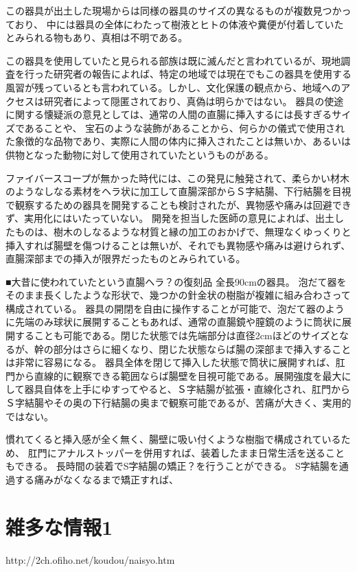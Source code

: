 この器具が出土した現場からは同様の器具のサイズの異なるものが複数見つかっており、
中には器具の全体にわたって樹液とヒトの体液や糞便が付着していたとみられる物もあり、真相は不明である。

この器具を使用していたと見られる部族は既に滅んだと言われているが、現地調査を行った研究者の報告によれば、特定の地域では現在でもこの器具を使用する風習が残っているとも言われている。しかし、文化保護の観点から、地域へのアクセスは研究者によって隠匿されており、真偽は明らかではない。
器具の使途に関する懐疑派の意見としては、通常の人間の直腸に挿入するには長すぎるサイズであることや、
宝石のような装飾があることから、何らかの儀式で使用された象徴的な品物であり、実際に人間の体内に挿入されたことは無いか、あるいは供物となった動物に対して使用されていたというものがある。

ファイバースコープが無かった時代には、この発見に触発されて、柔らかい材木のようなしなる素材をヘラ状に加工して直腸深部からＳ字結腸、下行結腸を目視で観察するための器具を開発することも検討されたが、異物感や痛みは回避できず、実用化にはいたっていない。
開発を担当した医師の意見によれば、出土したものは、樹木のしなるような材質と縁の加工のおかげで、無理なくゆっくりと挿入すれば腸壁を傷つけることは無いが、それでも異物感や痛みは避けられず、直腸深部までの挿入が限界だったものとみられている。

■大昔に使われていたという直腸ヘラ？の復刻品
全長90cmの器具。
泡だて器をそのまま長くしたような形状で、幾つかの針金状の樹脂が複雑に組み合わさって構成されている。
器具の開閉を自由に操作することが可能で、泡だて器のように先端のみ球状に展開することもあれば、通常の直腸鏡や膣鏡のように筒状に展開することも可能である。閉じた状態では先端部分は直径2cmほどのサイズとなるが、幹の部分はさらに細くなり、閉じた状態ならば腸の深部まで挿入することは非常に容易になる。
器具全体を閉じて挿入した状態で筒状に展開すれば、肛門から直線的に観察できる範囲ならば腸壁を目視可能である。展開強度を最大にして器具自体を上手にゆすってやると、Ｓ字結腸が拡張・直線化され、肛門からＳ字結腸やその奥の下行結腸の奥まで観察可能であるが、苦痛が大きく、実用的ではない。

慣れてくると挿入感が全く無く、腸壁に吸い付くような樹脂で構成されているため、
肛門にアナルストッパーを併用すれば、装着したまま日常生活を送ることもできる。
長時間の装着でS字結腸の矯正？を行うことができる。
S字結腸を通過する痛みがなくなるまで矯正すれば、



\section{雑多な情報1}
http://2ch.ofiho.net/koudou/naisyo.htm

